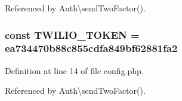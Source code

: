 Referenced by Auth\textbackslash{}send\+Two\+Factor().

\hypertarget{config_8php_a0477d5c66524299f08cae7376eb7884c}{}
\subsubsection[{T\+W\+I\+L\+I\+O\+\_\+\+T\+O\+K\+E\+N}]{\setlength{\rightskip}{0pt plus 5cm}const T\+W\+I\+L\+I\+O\+\_\+\+T\+O\+K\+E\+N = \textquotesingle{}ea734470b88c855cdfa849bf62881fa2\textquotesingle{}}\label{config_8php_a0477d5c66524299f08cae7376eb7884c}


Definition at line 14 of file config.\+php.



Referenced by Auth\textbackslash{}send\+Two\+Factor().

